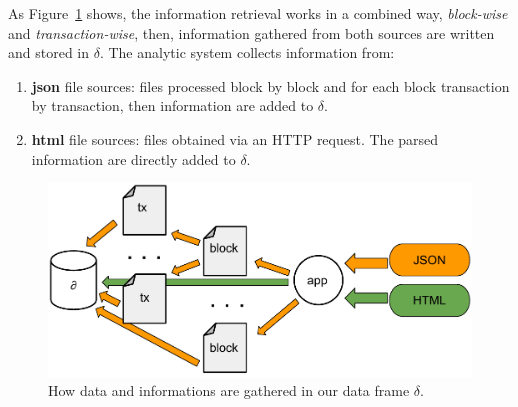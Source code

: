 \documentclass[USenglish]{uit-thesis}
\begin{document}
As Figure~\ref{fig:retrieval_scheme} shows,
the information retrieval works
in a combined way, \emph{block-wise} and \emph{transaction-wise},
then, information gathered from both sources are
written and stored in $\delta$. The analytic system
collects information from:
\begin{enumerate}[noitemsep]
	\item \textbf{\gls{json}} file sources: files processed block by block and
	for each block transaction by transaction, then information are added to $\delta$.
	\item \textbf{\gls{html}} file sources: files obtained via an HTTP request. The parsed information are directly added to $\delta$.
	 
\end{enumerate}
\begin{figure}[h]
	\centering
	\includegraphics[width=1\textwidth]{img/retrieval_scheme}
	\caption{How data and informations are gathered in our data frame $\delta$.}
	\label{fig:retrieval_scheme}
\end{figure}
\end{document}
